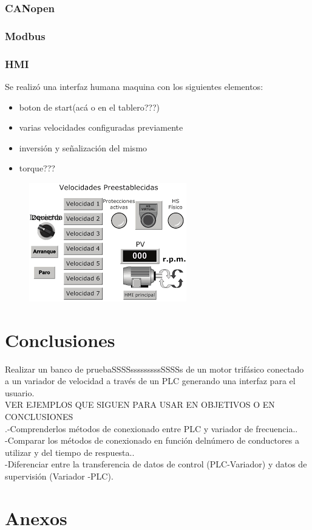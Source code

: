\documentclass[12pt,a4paper]{article}
\begin{document}
	
	

	\section{CANopen}
	\section{Modbus}
	
	\section {HMI}
	Se realizó una interfaz humana maquina con los siguientes elementos:
		\begin{itemize}
			\item boton de start(acá o en el tablero???)
			\item varias velocidades configuradas previamente
			\item inversión y señalización del mismo
			\item torque???
		\end{itemize}
		\begin{figure}[htb]
			\centering
			\includegraphics{HMIej.png}
		\end{figure}
 	\part{Conclusiones}
 		Realizar un banco de pruebaSSSSsssssssssSSSSs de un motor trifásico conectado a un variador de velocidad a través de un PLC generando una interfaz para el usuario.\\
 	VER EJEMPLOS QUE SIGUEN PARA USAR EN OBJETIVOS O EN CONCLUSIONES\\
 	.-Comprenderlos   métodos de   conexionado   entre   PLC   y   variador   de frecuencia..\\-Comparar   los   métodos   de   conexionado   en   función   delnúmero   de conductores a utilizar y del tiempo de respuesta..\\-Diferenciar entre la transferencia de datos de control (PLC-Variador) y datos de supervisión (Variador -PLC).
 	\part{Anexos}

	
\end{document}
